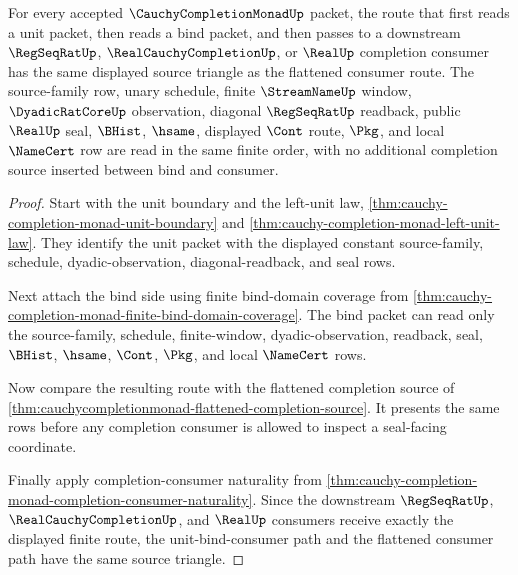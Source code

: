 \begin{theorem}
\label{thm:cauchy-completion-monad-kleisli-source-triangle}
For every accepted $\CauchyCompletionMonadUp$ packet, the route that first reads a unit packet, then reads a bind packet, and then passes to a downstream $\RegSeqRatUp$, $\RealCauchyCompletionUp$, or $\RealUp$ completion consumer has the same displayed source triangle as the flattened consumer route. The source-family row, unary schedule, finite $\StreamNameUp$ window, $\DyadicRatCoreUp$ observation, diagonal $\RegSeqRatUp$ readback, public $\RealUp$ seal, $\BHist$, $\hsame$, displayed $\Cont$ route, $\Pkg$, and local $\NameCert$ row are read in the same finite order, with no additional completion source inserted between bind and consumer.
\end{theorem}
\begin{proof}
Start with the unit boundary and the left-unit law, \autoref{thm:cauchy-completion-monad-unit-boundary} and \autoref{thm:cauchy-completion-monad-left-unit-law}. They identify the unit packet with the displayed constant source-family, schedule, dyadic-observation, diagonal-readback, and seal rows.

Next attach the bind side using finite bind-domain coverage from \autoref{thm:cauchy-completion-monad-finite-bind-domain-coverage}. The bind packet can read only the source-family, schedule, finite-window, dyadic-observation, readback, seal, $\BHist$, $\hsame$, $\Cont$, $\Pkg$, and local $\NameCert$ rows.

Now compare the resulting route with the flattened completion source of \autoref{thm:cauchycompletionmonad-flattened-completion-source}. It presents the same rows before any completion consumer is allowed to inspect a seal-facing coordinate.

Finally apply completion-consumer naturality from \autoref{thm:cauchy-completion-monad-completion-consumer-naturality}. Since the downstream $\RegSeqRatUp$, $\RealCauchyCompletionUp$, and $\RealUp$ consumers receive exactly the displayed finite route, the unit-bind-consumer path and the flattened consumer path have the same source triangle.
\end{proof}

